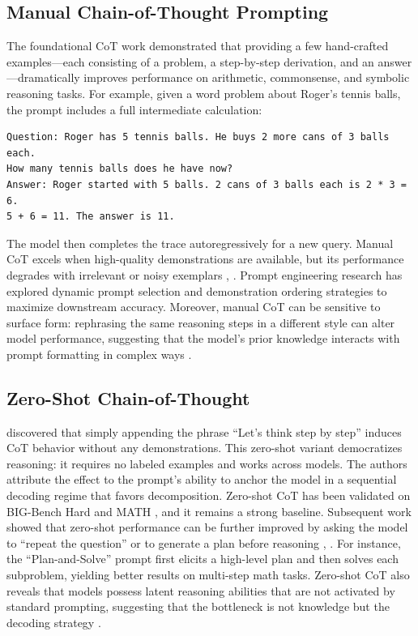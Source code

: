 \documentclass[11pt,a4paper]{article}
\begin{document}
\subsection{Manual Chain-of-Thought Prompting}
The foundational CoT work \citep{wei2022chain} demonstrated that providing a few hand-crafted examples---each consisting of a problem, a step-by-step derivation, and an answer---dramatically improves performance on arithmetic, commonsense, and symbolic reasoning tasks. For example, given a word problem about Roger's tennis balls, the prompt includes a full intermediate calculation:
\begin{verbatim}
Question: Roger has 5 tennis balls. He buys 2 more cans of 3 balls each.
How many tennis balls does he have now?
Answer: Roger started with 5 balls. 2 cans of 3 balls each is 2 * 3 = 6.
5 + 6 = 11. The answer is 11.
\end{verbatim}
The model then completes the trace autoregressively for a new query. Manual CoT excels when high-quality demonstrations are available, but its performance degrades with irrelevant or noisy exemplars \citep{min2022rethinking}, \citep{lu2022dynamic}. Prompt engineering research has explored dynamic prompt selection \citep{lu2022dynamic} and demonstration ordering strategies to maximize downstream accuracy. Moreover, manual CoT can be sensitive to surface form: rephrasing the same reasoning steps in a different style can alter model performance, suggesting that the model's prior knowledge interacts with prompt formatting in complex ways \citep{webson2021prompt}.

\subsection{Zero-Shot Chain-of-Thought}
\citet{kojima2022large} discovered that simply appending the phrase ``Let's think step by step'' induces CoT behavior without any demonstrations. This zero-shot variant democratizes reasoning: it requires no labeled examples and works across models. The authors attribute the effect to the prompt's ability to anchor the model in a sequential decoding regime that favors decomposition. Zero-shot CoT has been validated on BIG-Bench Hard \citep{suzgun2022challenging} and MATH \citep{hendrycks2021measuring}, and it remains a strong baseline. Subsequent work showed that zero-shot performance can be further improved by asking the model to ``repeat the question'' or to generate a plan before reasoning \citep{press2022measuring}, \citep{wang2023plan}. For instance, the ``Plan-and-Solve'' prompt first elicits a high-level plan and then solves each subproblem, yielding better results on multi-step math tasks. Zero-shot CoT also reveals that models possess latent reasoning abilities that are not activated by standard prompting, suggesting that the bottleneck is not knowledge but the decoding strategy \citep{kojima2022large}.
\end{document}
